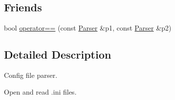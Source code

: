 \subsection*{Friends}
\begin{DoxyCompactItemize}
\item 
bool \hyperlink{a00048_adb2a41131c66652419c9e686ae7deb06}{operator==} (const \hyperlink{a00048}{Parser} \&p1, const \hyperlink{a00048}{Parser} \&p2)
\end{DoxyCompactItemize}


\subsection{Detailed Description}
Config file parser. 

Open and read .ini files. 

